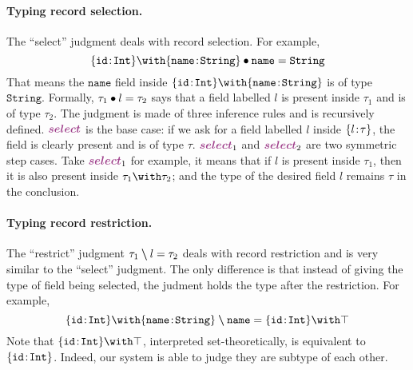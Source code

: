 \paragraph{Typing record selection.}
The ``select'' judgment deals with record selection. For example,
\[
\judgeselect {\recty {\texttt{id}} \Int \andop \recty {\texttt{name}} \String}
{\texttt{name}} {\String}
\]
That means the $\texttt{name}$ field inside
$\recty {\texttt{id}} \Int \andop \recty {\texttt{name}} \String$ is of type
$\texttt{String}$. Formally, $\tau_1 \bullet l = \tau_2$ says that a field
labelled $l$ is present inside $\tau_1$ and is of type $\tau_2$. The judgment is
made of three inference rules and is recursively defined. $\rulelabelselect$ is
the base case: if we ask for a field labelled $l$ inside $\{ l \!:\! \tau \}$, the
field is clearly present and is of type $\tau$. $\rulelabelselectleft$ and
$\rulelabelselectright$ are two symmetric step cases. Take
$\rulelabelselectleft$ for example, it means that if $l$ is present inside
$\tau_1$, then it is also present inside $\tau_1 \andop \tau_2$; and the type of
the desired field $l$ remains $\tau$ in the conclusion.

\paragraph{Typing record restriction.}
The ``restrict'' judgment $\tau_1 \bm{\setminus} l = \tau_2$ deals with record
restriction and is very similar to the ``select'' judgment. The only difference
is that instead of giving the type of field being selected, the judment holds
the type after the restriction. For example,
\[
\judgerestrict {\recty {\code{id}} \Int \andop \recty {\code{name}} \String}
{\code{name}} {\recty {\code{id}} \Int \andop \top}
\]
Note that $\recty {\code{id}} \Int \andop \top$, interpreted set-theoretically,
is equivalent to $\{ \texttt{id} \!:\! \texttt{Int} \}$. Indeed, our system is able to judge
they are subtype of each other.


